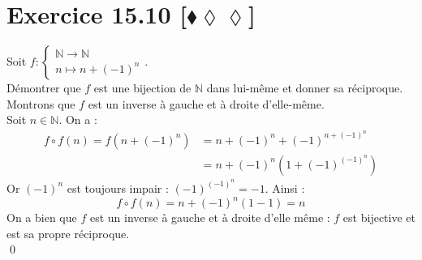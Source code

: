 \documentclass[10pt]{article}
\begin{document}
\section*{Exercice 15.10 [$\blacklozenge\lozenge\lozenge$]}
\begin{tcolorbox}[enhanced, width=7.6in, center, size=fbox, fontupper=\large, drop shadow southwest]
    Soit $f:\begin{cases}\mathbb{N} \to \mathbb{N} \\ n \mapsto n + (-1)^n\end{cases}$.\\
    Démontrer que $f$ est une bijection de $\mathbb{N}$ dans lui-même et donner sa réciproque.\\[0.2cm]
    Montrons que $f$ est un inverse à gauche et à droite d'elle-même.\\
    Soit $n\in\mathbb{N}$. On a :
    \begin{align*}
        f \circ f (n) = f(n + (-1)^n) &= n + (-1)^n + (-1)^{n + (-1)^n} \\
        &= n + (-1)^n(1+(-1)^{(-1)^n})
    \end{align*}
    Or $(-1)^n$ est toujours impair : $(-1)^{(-1)^n} = -1$. Ainsi :
    \begin{equation*}
        f\circ f(n) = n + (-1)^n(1-1) = n
    \end{equation*}
    On a bien que $f$ est un inverse à gauche et à droite d'elle même : $f$ est bijective et est sa propre réciproque.\\
    \qed
\end{tcolorbox}
\end{document}
